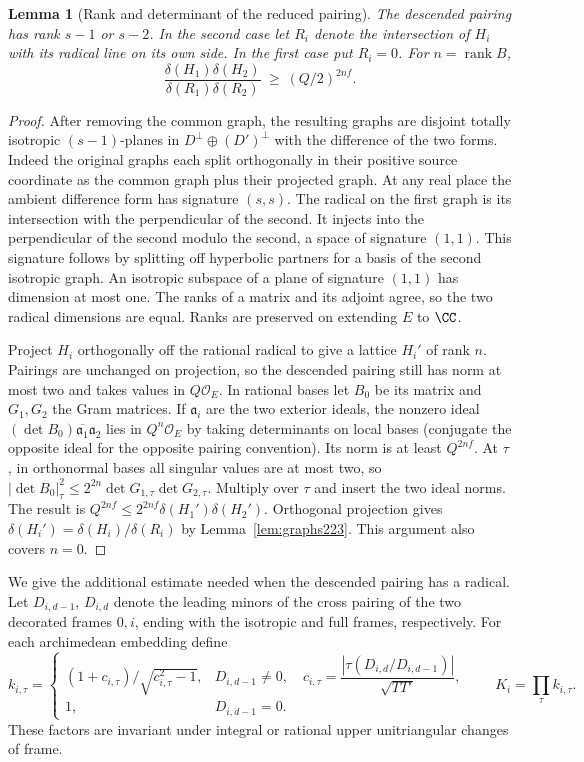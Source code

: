 \documentclass[a4paper,11pt]{article}
\newtheorem{lemma}[proposition]{Lemma}
\theoremstyle{definition}
\theoremstyle{remark}
\numberwithin{equation}{section}
\newcommand{\OO}{\mathcal O}
\begin{document}
\begin{lemma}[Rank and determinant of the reduced pairing]
\label{lem:detpair223}
The descended pairing has rank \(s-1\) or \(s-2\). In the
second case let \(R_i\) denote the intersection of \(H_i\)
with its radical line on its own side. In the first case
put \(R_i=0\). For \(n=\operatorname{rank}B\),
\[
  \frac{\delta(H_1)\delta(H_2)}{\delta(R_1)\delta(R_2)}
                               \ \ge\ (Q/2)^{2nf}.
\]
\end{lemma}
\begin{proof}
After removing the common graph, the resulting graphs are
disjoint totally isotropic \((s-1)\)-planes in
\(D^\perp\oplus(D')^\perp\) with the difference of the two
forms. Indeed the original graphs each split orthogonally
in their positive source coordinate as the common graph
plus their projected graph. At any real place the ambient
difference form has signature \((s,s)\). The radical on
the first graph is its intersection with the perpendicular
of the second. It injects into the perpendicular of the
second modulo the second, a space of signature \((1,1)\).
This signature follows by splitting off hyperbolic partners
for a basis of the second isotropic graph. An isotropic
subspace of a plane of signature \((1,1)\) has dimension
at most one. The ranks of a matrix and its adjoint agree,
so the two radical dimensions are equal. Ranks are
preserved on extending \(E\) to \(\CC\).

Project \(H_i\) orthogonally off the rational radical to
give a lattice \(H_i'\) of rank \(n\). Pairings are unchanged
on projection, so the descended pairing still has norm at
most two and takes values in \(Q\OO_E\). In rational bases
let \(B_0\) be its matrix and \(G_1,G_2\) the Gram matrices.
If \(\mathfrak a_i\) are the two exterior ideals, the
nonzero ideal
\((\det B_0)\overline{\mathfrak a_1}\mathfrak a_2\)
lies in \(Q^n\OO_E\) by taking determinants on local bases
(conjugate the opposite ideal for the opposite pairing
convention). Its norm is at least \(Q^{2nf}\). At \(\tau\),
in orthonormal bases all singular values are at most two,
so \(|\det B_0|_\tau^2\le 2^{2n}\det G_{1,\tau}\det G_{2,\tau}\).
Multiply over \(\tau\) and insert the two ideal norms. The
result is \(Q^{2nf}\le 2^{2nf}\delta(H_1')\delta(H_2')\).
Orthogonal projection gives \(\delta(H_i')=\delta(H_i)/\delta(R_i)\)
by Lemma~\ref{lem:graphs223}. This argument also covers \(n=0\).
\end{proof}

We give the additional estimate needed when the descended
pairing has a radical. Let \(D_{i,d-1}\), \(D_{i,d}\) denote
the leading minors of the cross pairing of the two decorated
frames \(0,i\), ending with the isotropic and full frames,
respectively. For each archimedean embedding define
\[
 k_{i,\tau}=
 \begin{cases}
  (1+c_{i,\tau})/\sqrt{c_{i,\tau}^2-1},&
            D_{i,d-1}\ne0,\quad
     c_{i,\tau}=\dfrac{|\tau(D_{i,d}/D_{i,d-1})|}{\sqrt{TT'}},\\[4pt]
  1,&D_{i,d-1}=0 .
 \end{cases}
 \qquad K_i=\prod_\tau k_{i,\tau}.
\]
These factors are invariant under integral or rational
upper unitriangular changes of frame.
\end{document}
